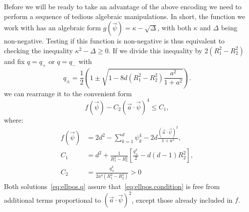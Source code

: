 Before we will be ready to take an advantage of the above encoding we need to  perform a sequence of tedious algebraic manipulations. In short, the function we work with has an algebraic form $g(\vec\psi)=\kappa-\sqrt{\Delta}$, with both $\kappa$ and $\Delta$ being non-negative. Testing if this function is non-negative is thus equivalent to checking the inequality $\kappa^2- \Delta\geq 0$. If we divide this inequality by $2(R_1^2-R_2^2)$ and fix $q=q_+$ or $q=q_-$ with
\[
  q_{\pm}=\frac{1}{2}\left(1\pm\sqrt{1-8d\left(R_{1}^{2}-R_{2}^{2}\right)\frac{a^{2}}{1+a^{2}}}\right).\label{eq:ellpos.q}
\]
we can rearrange it to the convenient form
\[
  f\left(\vec{\psi}\right)-C_{2}{\left(\vec{a}\cdot\vec{\psi}\right)}^{4}\leq C_{1},
  \label{eq:ellpos.condition}
\]
where:
\begin{align}
  f\left(\vec{\psi}\right) &= 2d^{2}-\sum_{k=1}^{d}\psi_{k}^{4}-2d\frac{{\left(\vec{a}\cdot\vec{\psi}\right)}^{2}}{1+a^{2}}, \\
  \label{eq:ellpos.def_c1}
  C_{1}&=d^{2}+\frac{1}{R_{1}^{2}-R_{2}^{2}}\left[\frac{q_{\pm}^{2}}{2}-d\left(d-1\right)R_{2}^{2}\right], \\
  C_{2}&=\frac{q_{\mp}^{2}}{2a^{4}\left(R_{1}^{2}-R_{2}^{2}\right)}>0
\end{align}
Both solutions~\eqref{eq:ellpos.q} assure that~\eqref{eq:ellpos.condition} is free from additional terms proportional to ${\left(\vec{a}\cdot\vec{\psi}\right)}^{2}$, except those already included in $f$.

